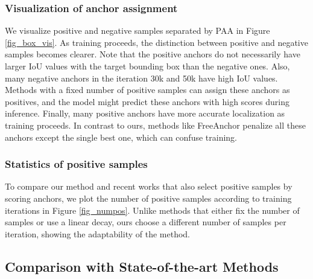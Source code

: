\documentclass[runningheads]{llncs}
\begin{document}
\subsubsection{Visualization of anchor assignment}
We visualize positive and negative samples separated by PAA in Figure \ref{fig_box_vis}. As training proceeds, the distinction between positive and negative samples becomes clearer. Note that the positive anchors do not necessarily have larger IoU values with the target bounding box than the negative ones. Also, many negative anchors in the iteration 30k and 50k have high IoU values. Methods with a fixed number of positive samples\cite{mal, noisy} can assign these anchors as positives, and the model might predict these anchors with high scores during inference. Finally, many positive anchors have more accurate localization as training proceeds. In contrast to ours, methods like FreeAnchor\cite{freeanchor} penalize all these anchors except the single best one, which can confuse training. 

\subsubsection{Statistics of positive samples}
To compare our method and recent works that also select positive samples by scoring anchors, we plot the number of positive samples according to training iterations in Figure \ref{fig_numpos}. Unlike methods that either fix the number of samples \cite{noisy} or use a linear decay\cite{mal}, ours choose a different number of samples per iteration, showing the adaptability of the method.

\subsection{Comparison with State-of-the-art Methods}
\end{document}
